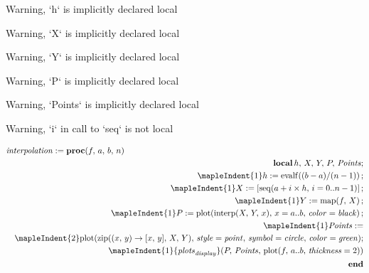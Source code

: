 \documentclass{article}
\begin{document}
\begin{maplegroup}
\begin{mapleinput}
\end{mapleinput}

\mapleresult
\begin{maplettyout}
Warning, `h` is implicitly declared local
\end{maplettyout}

\begin{maplettyout}
Warning, `X` is implicitly declared local
\end{maplettyout}

\begin{maplettyout}
Warning, `Y` is implicitly declared local
\end{maplettyout}

\begin{maplettyout}
Warning, `P` is implicitly declared local
\end{maplettyout}

\begin{maplettyout}
Warning, `Points` is implicitly declared local
\end{maplettyout}

\begin{maplettyout}
Warning, `i` in call to `seq` is not local
\end{maplettyout}

\begin{maplelatex}
\begin{eqnarray*}
\lefteqn{\mathit{interpolation} := \textbf{proc} (f, \,a, \,b, \,
n)} \\
 & & \textbf{local} \,h, \,X, \,Y, \,P, \,\mathit{Points}; \\
 & & \mapleIndent{1} h := \mathrm{evalf}((b - a)/(n - 1))\,; \\
 & & \mapleIndent{1} X := [\mathrm{seq}(a + i \times h, \,i=0 .. 
n - 1)]\,; \\
 & & \mapleIndent{1} Y := \mathrm{map}(f, \,X)\,; \\
 & & \mapleIndent{1} P := \mathrm{plot}(\mathrm{interp}(X, \,Y, 
\,x), \,x=a .. b, \,\mathit{color}=\mathit{black})\,; \\
 & & \mapleIndent{1} \mathit{Points} :=  \\
 & & \mapleIndent{2} \mathrm{plot}(\mathrm{zip}((x, \,y)
\rightarrow [x, \,y], \,X, \,Y), \,\mathit{style}=\mathit{point}
, \,\mathit{symbol}=\mathit{circle}, \,\mathit{color}=\mathit{
green}); \\
 & & \mapleIndent{1} {\mathit{plots}_{\mathit{display}}}(P, \,
\mathit{Points}, \,\mathrm{plot}(f, \,a .. b, \,\mathit{thickness
}=2)) \\
 & & \textbf{end} 
\end{eqnarray*}
\end{maplelatex}

\end{maplegroup}
\end{document}
